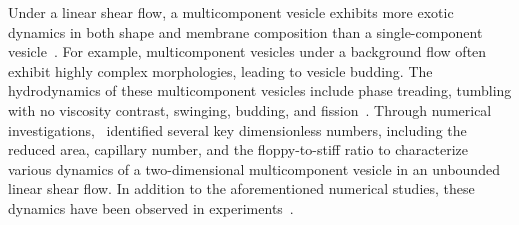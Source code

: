 \documentclass[twoside,twocolumn,9pt]{article}
\begin{document}
Under a linear shear flow, a multicomponent vesicle exhibits more exotic
dynamics in both shape and membrane composition than a single-component
vesicle~\cite{soh-tse-li-voi-low2010, Smith2007_JChemPhys,
Cox2015_Nonlinearity, liu-mar-li-vee-low2017, Tusch2018_PRF,
Gera2018_SoftMatter, ger-sal-spa2022}. For example, multicomponent
vesicles under a background flow often exhibit highly complex
morphologies, leading to vesicle budding. The hydrodynamics of these
multicomponent vesicles include phase treading, tumbling with no
viscosity contrast, swinging, budding, and
fission~\cite{soh-tse-li-voi-low2010, wan-du2008, all-ama2006,
ger-sal-spa2022, lip1992, urs-klu-phi2009}. Through numerical
investigations,~\citet{liu-mar-li-vee-low2017} identified several key
dimensionless numbers, including the reduced area, capillary number, and
the floppy-to-stiff ratio to characterize various dynamics of a
two-dimensional multicomponent vesicle in an unbounded linear shear
flow. In addition to the aforementioned numerical studies, these
dynamics have been observed in experiments~\cite{bag-sun2009,
yan-ima-tan2010, yan-ima-tan2008, dre-jah-bob-spa-gop2021}.
%
\end{document}
